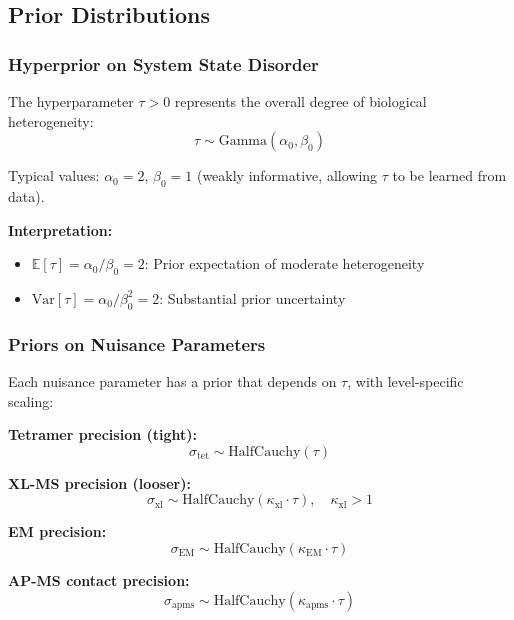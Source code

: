 \documentclass[11pt,a4paper]{article}
\newcommand{\E}{\mathbb{E}}
\newcommand{\Var}{\mathrm{Var}}
\newcommand{\HalfCauchy}{\mathrm{HalfCauchy}}
\newcommand{\GammaDist}{\mathrm{Gamma}}
\theoremstyle{definition}
\begin{document}
\subsection{Prior Distributions}

\subsubsection{Hyperprior on System State Disorder}

The hyperparameter $\tau > 0$ represents the overall degree of biological heterogeneity:
\begin{equation}
    \tau \sim \GammaDist(\alpha_0, \beta_0)
\end{equation}

Typical values: $\alpha_0 = 2$, $\beta_0 = 1$ (weakly informative, allowing $\tau$ to be learned from data).

\textbf{Interpretation:}
\begin{itemize}
    \item $\E[\tau] = \alpha_0 / \beta_0 = 2$: Prior expectation of moderate heterogeneity
    \item $\Var[\tau] = \alpha_0 / \beta_0^2 = 2$: Substantial prior uncertainty
\end{itemize}

\subsubsection{Priors on Nuisance Parameters}

Each nuisance parameter has a prior that depends on $\tau$, with level-specific scaling:

\textbf{Tetramer precision (tight):}
\begin{equation}
    \sigma_{\text{tet}} \sim \HalfCauchy(\tau)
\end{equation}

\textbf{XL-MS precision (looser):}
\begin{equation}
    \sigma_{\text{xl}} \sim \HalfCauchy(\kappa_{\text{xl}} \cdot \tau), \quad \kappa_{\text{xl}} > 1
\end{equation}

\textbf{EM precision:}
\begin{equation}
    \sigma_{\text{EM}} \sim \HalfCauchy(\kappa_{\text{EM}} \cdot \tau)
\end{equation}

\textbf{AP-MS contact precision:}
\begin{equation}
    \sigma_{\text{apms}} \sim \HalfCauchy(\kappa_{\text{apms}} \cdot \tau)
\end{equation}
\end{document}
